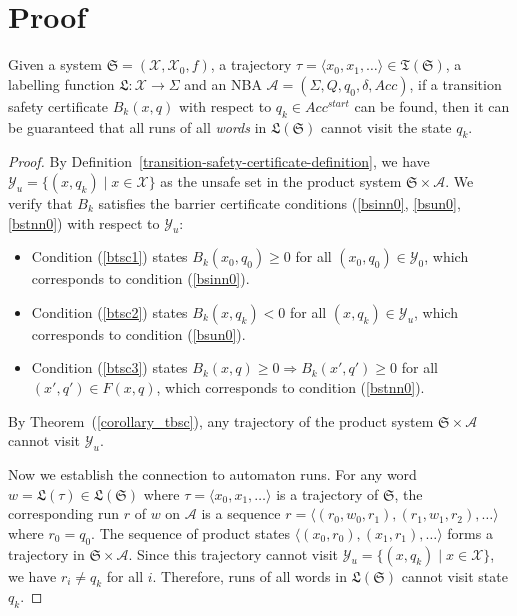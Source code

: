 \section{Proof}
\label{appendix-proof}
\begin{lemma}
  Given a system $\mathfrak{S} = (\mathcal{X}, \mathcal{X}_0, f)$, a trajectory $\tau=\langle x_0, x_1, \dots \rangle \in \mathfrak{T}(\mathfrak{S})$, a labelling function $\mathfrak{L}:\mathcal{X} \rightarrow \Sigma$ and an NBA $\mathcal{A}=(\Sigma, Q, q_0, \delta, Acc)$, if a transition safety certificate $B_{k}(x, q)$ with respect to $q_k \in Acc^{start}$ can be found, then it can be guaranteed that all runs of all \emph{words} in $\mathfrak{L}(\mathfrak{S})$ cannot visit the state $q_k$.
\end{lemma}

\begin{proof}
  By Definition~\ref{transition-safety-certificate-definition}, we have $\mathcal{Y}_u = \{(x, q_k) \mid x \in \mathcal{X}\}$ as the unsafe set in the product system $\mathfrak{S} \times \mathcal{A}$. We verify that $B_k$ satisfies the barrier certificate conditions (\ref{bsinn0}, \ref{bsun0}, \ref{bstnn0}) with respect to $\mathcal{Y}_u$:
  \begin{itemize}
    \item Condition (\ref{btsc1}) states $B_k(x_0, q_0) \geq 0$ for all $(x_0, q_0) \in \mathcal{Y}_0$, which corresponds to condition (\ref{bsinn0}).
    \item Condition (\ref{btsc2}) states $B_k(x, q_k) < 0$ for all $(x, q_k) \in \mathcal{Y}_u$, which corresponds to condition (\ref{bsun0}).
    \item Condition (\ref{btsc3}) states $B_k(x, q) \geq 0 \Rightarrow B_k(x', q') \geq 0$ for all $(x', q') \in F(x, q)$, which corresponds to condition (\ref{bstnn0}).
  \end{itemize}

  By Theorem~(\ref{corollary_tbsc}), any trajectory of the product system $\mathfrak{S} \times \mathcal{A}$ cannot visit $\mathcal{Y}_u$.

  Now we establish the connection to automaton runs. For any word $w = \mathfrak{L}(\tau) \in \mathfrak{L}(\mathfrak{S})$ where $\tau = \langle x_0, x_1, \dots \rangle$ is a trajectory of $\mathfrak{S}$, the corresponding run $r$ of $w$ on $\mathcal{A}$ is a sequence $r = \langle (r_0, w_0, r_1), (r_1, w_1, r_2), \ldots \rangle$ where $r_0 = q_0$. The sequence of product states $\langle (x_0, r_0), (x_1, r_1), \ldots \rangle$ forms a trajectory in $\mathfrak{S} \times \mathcal{A}$. Since this trajectory cannot visit $\mathcal{Y}_u = \{(x, q_k) \mid x \in \mathcal{X}\}$, we have $r_i \neq q_k$ for all $i$. Therefore, runs of all words in $\mathfrak{L}(\mathfrak{S})$ cannot visit state $q_k$.
\end{proof}

